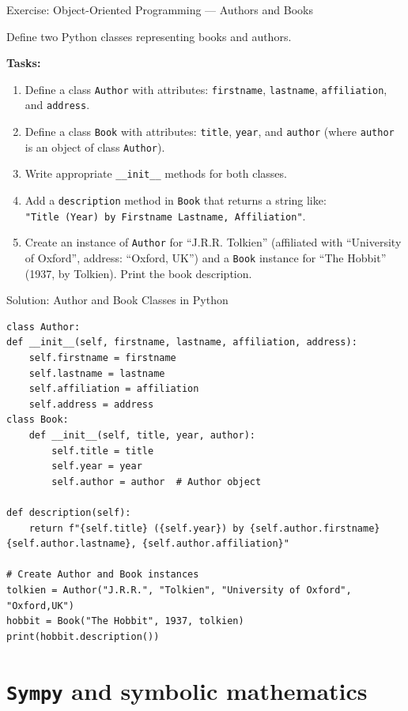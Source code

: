 \documentclass[10pt]{beamer}
\begin{document}
\begin{frame}{Exercise: Object-Oriented Programming — Authors and Books}

Define two Python classes representing books and authors.

\textbf{Tasks:}
\begin{enumerate}
\item Define a class \texttt{Author} with attributes: \texttt{firstname}, \texttt{lastname}, \texttt{affiliation}, and \texttt{address}.
\item Define a class \texttt{Book} with attributes: \texttt{title}, \texttt{year}, and \texttt{author} (where \texttt{author} is an object of class \texttt{Author}).
\item Write appropriate \texttt{\_\_init\_\_} methods for both classes.
\item Add a \texttt{description} method in \texttt{Book} that returns a string like:\\
\texttt{"Title (Year) by Firstname Lastname, Affiliation"}.
\item Create an instance of \texttt{Author} for ``J.R.R. Tolkien'' (affiliated with ``University of Oxford'', address: ``Oxford, UK'') and a \texttt{Book} instance for ``The Hobbit'' (1937, by Tolkien). Print the book description.
\end{enumerate}
\end{frame}

\begin{frame}[fragile]{Solution: Author and Book Classes in Python}
\begin{lstlisting}[style=mypython]
class Author:
def __init__(self, firstname, lastname, affiliation, address):
	self.firstname = firstname
	self.lastname = lastname
	self.affiliation = affiliation
	self.address = address
class Book:
	def __init__(self, title, year, author):
		self.title = title
		self.year = year
		self.author = author  # Author object

def description(self):
	return f"{self.title} ({self.year}) by {self.author.firstname} {self.author.lastname}, {self.author.affiliation}"

# Create Author and Book instances
tolkien = Author("J.R.R.", "Tolkien", "University of Oxford", "Oxford,UK")
hobbit = Book("The Hobbit", 1937, tolkien)
print(hobbit.description())
\end{lstlisting}
\end{frame}
\section{\textbf{\texttt{Sympy} and symbolic mathematics}}
\end{document}
